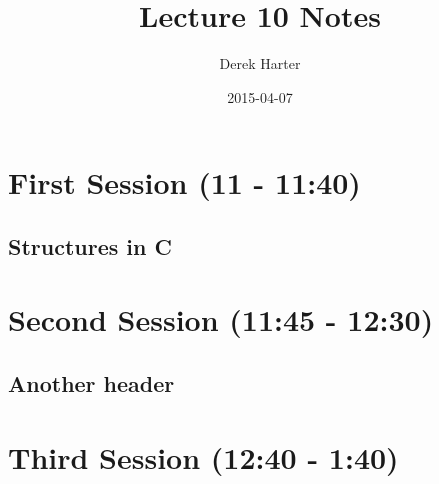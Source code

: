 \documentclass[11pt]{article}
\title{Lecture 10 Notes}
\author{Derek Harter}
\date{2015-04-07}
\begin{document}
\maketitle


\section{First Session (11 - 11:40)}
\label{sec-1}
\subsection{Structures in C}
\label{sec-1-1}
\section{Second Session (11:45 - 12:30)}
\label{sec-2}
\subsection{Another header}
\label{sec-2-1}
\section{Third Session (12:40 - 1:40)}
\label{sec-3}
\end{document}
